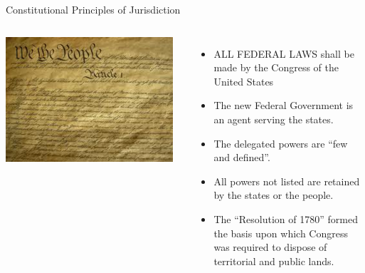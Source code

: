 \begin{frame}{Constitutional Principles of Jurisdiction}
    \begin{columns}[onlytextwidth]
            \centering
            \includegraphics[width=0.95\textwidth]{img/constitution.png} \\

            \begin{itemize}
                \item ALL FEDERAL LAWS shall be made by the Congress of the United States
                \item The new Federal Government is an agent serving the states.
                \item The delegated powers are “few and defined”. 
                \item All powers not listed are retained by the states or the people.
                \item The “Resolution of 1780”  formed the basis upon which Congress was required to dispose of territorial and public lands.
            \end{itemize}
    \end{columns}
\end{frame}



